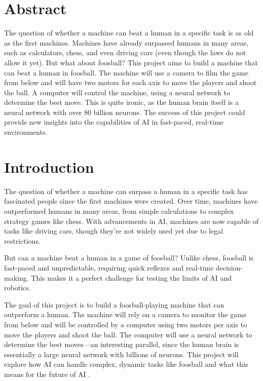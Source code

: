 \section{Abstract}\label{sec:abstract}

The question of whether a machine can beat a human in a specific task is as old as the first machines.
Machines have already surpassed humans in many areas, such as calculators, chess, and even driving cars (even though the laws do not allow it yet).
But what about foosball?
This project aims to build a machine that can beat a human in foosball.
The machine will use a camera to film the game from below and will have two motors for each axis to move the players and shoot the ball.
A computer will control the machine, using a neural network to determine the best move.
This is quite ironic, as the human brain itself is a neural network with over 80 billion neurons.
The success of this project could provide new insights into the capabilities of AI in fast-paced, real-time environments.


\section{Introduction}\label{sec:introduction}

The question of whether a machine can surpass a human in a specific task has fascinated people since the first machines were created.
Over time, machines have outperformed humans in many areas, from simple calculations to complex strategy games like chess.
With advancements in AI, machines are now capable of tasks like driving cars, though they’re not widely used yet due to legal restrictions.

But can a machine beat a human in a game of foosball?
Unlike chess, foosball is fast-paced and unpredictable, requiring quick reflexes and real-time decision-making.
This makes it a perfect challenge for testing the limits of AI and robotics.

The goal of this project is to build a foosball-playing machine that can outperform a human.
The machine will rely on a camera to monitor the game from below and will be controlled by a computer using two motors per axis to move the players and shoot the ball.
The computer will use a neural network to determine the best moves—an interesting parallel, since the human brain is essentially a large neural network with billions of neurons.
This project will explore how AI can handle complex, dynamic tasks like foosball and what this means for the future of AI .


